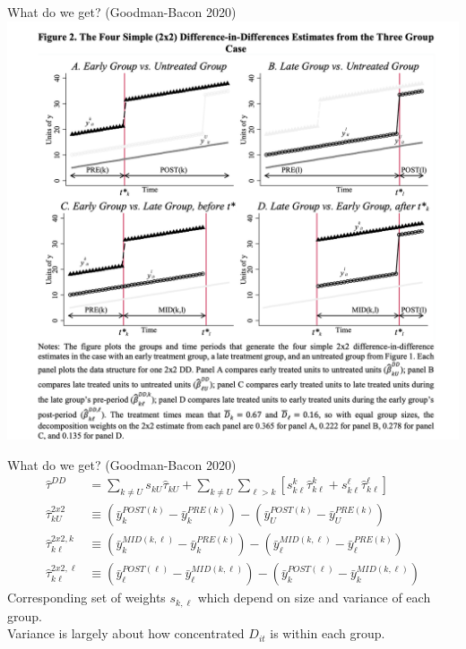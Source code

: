 \documentclass[xcolor=pdftex,dvipsnames,table,mathserif,aspectratio=169]{beamer}
\begin{document}
\begin{frame}{What do we get? (Goodman-Bacon 2020)}
\centering
\includegraphics[height=0.9\textheight]{resources/gb_fig2.png}
\end{frame}

\begin{frame}{What do we get? (Goodman-Bacon 2020)}
\begin{align*}
\widehat{\tau}^{D D}&=\sum_{k \neq U} s_{k U} \widehat{\tau}_{k U}+\sum_{k \neq U} \sum_{\ell>k}\left[s_{k \ell}^{k} \widehat{\tau}_{k \ell}^{ k}+s_{k \ell}^{\ell} \widehat{\tau}_{k \ell}^{\ell}\right]\\
\widehat{\tau}_{k U}^{2 x 2} &\equiv\left(\bar{y}_{k}^{P O S T(k)}-\bar{y}_{k}^{P R E(k)}\right)-\left(\bar{y}_{U}^{P O S T(k)}-\bar{y}_{U}^{P R E(k)}\right) \\
\widehat{\tau}_{k \ell}^{2 x 2, k} &\equiv\left(\bar{y}_{k}^{M I D(k, \ell)}-\bar{y}_{k}^{P R E(k)}\right)-\left(\bar{y}_{\ell}^{M I D(k, \ell)}-\bar{y}_{\ell}^{P R E(k)}\right) \\
\widehat{\tau}_{k \ell}^{2 x 2, \ell} &\equiv\left(\bar{y}_{\ell}^{P O S T(\ell)}-\bar{y}_{\ell}^{M I D(k, \ell)}\right)-\left(\bar{y}_{k}^{P O S T(\ell)}-\bar{y}_{k}^{M I D(k, \ell)}\right)
\end{align*}
Corresponding set of weights $s_{k,\ell}$ which depend on size and variance of each group.\\
Variance is largely about how concentrated $D_{it}$ is within each group.
\end{frame}
\end{document}

